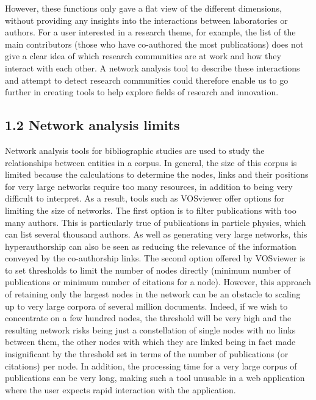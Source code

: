 \documentclass[
]{article}
\begin{document}
However, these functions only gave a flat view of the different
dimensions, without providing any insights into the interactions between
laboratories or authors. For a user interested in a research theme, for
example, the list of the main contributors (those who have co-authored
the most publications) does not give a clear idea of which research
communities are at work and how they interact with each other. A network
analysis tool to describe these interactions and attempt to detect
research communities could therefore enable us to go further in creating
tools to help explore fields of research and innovation.

\hypertarget{network-analysis-limits}{%
\subsection{1.2 Network analysis limits}\label{network-analysis-limits}}

Network analysis tools for bibliographic studies are used to study the
relationships between entities in a corpus. In general, the size of this
corpus is limited because the calculations to determine the nodes, links
and their positions for very large networks require too many resources,
in addition to being very difficult to interpret. As a result, tools
such as VOSviewer offer options for limiting the size of networks. The
first option is to filter publications with too many authors. This is
particularly true of publications in particle physics, which can list
several thousand authors. As well as generating very large networks,
this hyperauthorship can also be seen as reducing the relevance of the
information conveyed by the co-authorship links. The second option
offered by VOSviewer is to set thresholds to limit the number of nodes
directly (minimum number of publications or minimum number of citations
for a node). However, this approach of retaining only the largest nodes
in the network can be an obstacle to scaling up to very large corpora of
several million documents. Indeed, if we wish to concentrate on a few
hundred nodes, the threshold will be very high and the resulting network
risks being just a constellation of single nodes with no links between
them, the other nodes with which they are linked being in fact made
insignificant by the threshold set in terms of the number of
publications (or citations) per node. In addition, the processing time
for a very large corpus of publications can be very long, making such a
tool unusable in a web application where the user expects rapid
interaction with the application.
\end{document}
